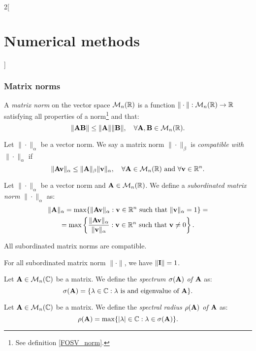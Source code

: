 \documentclass[../../../main.tex]{subfiles}
\begin{document}
\begin{multicols}{2}[\section{Numerical methods}]
\subsubsection*{Matrix norms}
\begin{definition}
    A \textit{matrix norm} on the vector space $\mathcal{M}_n(\mathbb{R})$ is a function $\|\cdot\|:\mathcal{M}_n(\mathbb{R})\rightarrow\mathbb{R}$ satisfying all properties of a norm\footnote{See definition \ref{FOSV_norm}.} and that: $$\|\vb{A}\vb{B}\|\leq\|\vb{A}\|\|\vb{B}\|,\quad\forall \vb{A},\vb{B}\in\mathcal{M}_n(\mathbb{R}).$$
\end{definition}
\begin{definition}
    Let $\|\cdot\|_\alpha$ be a vector norm. We say a matrix norm $\|\cdot\|_\beta$ is \textit{compatible with $\|\cdot\|_\alpha$} if $$\|\vb{A}\vb{v}\|_\alpha\leq\|\vb{A}\|_\beta\|\vb{v}\|_\alpha,\quad\forall\vb{A}\in\mathcal{M}_n(\mathbb{R})\text{ and }\forall\vb{v}\in\mathbb{R}^n.$$
\end{definition}
\begin{definition}
    Let $\|\cdot\|_\alpha$ be a vector norm and $\vb{A}\in\mathcal{M}_n(\mathbb{R})$. We define a \textit{subordinated matrix norm} $\|\cdot\|_\alpha$ as:
    \begin{multline*}
        \|\vb{A}\|_\alpha=\max\{\|\vb{A}\vb{v}\|_\alpha:\vb{v}\in\mathbb{R}^n\text{ such that }\|\vb{v}\|_\alpha=1\}=\\=\max\left\{\frac{\|\vb{A}\vb{v}\|_\alpha}{\|\vb{v}\|_\alpha}:\vb{v}\in\mathbb{R}^n\text{ such that }\vb{v}\ne 0\right\}.
    \end{multline*}
\end{definition}
\begin{lemma}
    All subordinated matrix norms are compatible.
\end{lemma}
\begin{lemma}
    For all subordinated matrix norm $\|\cdot\|$, we have $\|\vb{I}\|=1$.
\end{lemma}
\begin{definition}
    Let $\vb{A}\in\mathcal{M}_n(\mathbb{C})$ be a matrix. We define the \textit{spectrum $\sigma(\vb{A})$ of $\vb{A}$} as: $$\sigma(\vb{A})=\{\lambda\in\mathbb{C}:\lambda\text{ is and eigenvalue of }\vb{A}\}.$$
\end{definition}
\begin{definition}
    Let $\vb{A}\in\mathcal{M}_n(\mathbb{C})$ be a matrix. We define the \textit{spectral radius $\rho(\vb{A})$ of $\vb{A}$} as: $$\rho(\vb{A})=\max\{|\lambda|\in\mathbb{C}:\lambda\in\sigma(\vb{A})\}.$$

\end{definition}
\end{multicols}
\end{document}
